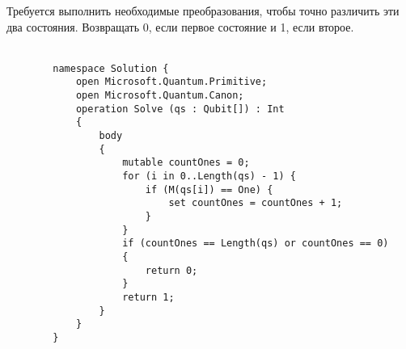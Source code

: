 \documentclass{article}
\begin{document}
\begin{enumerate}
        Требуется выполнить необходимые преобразования, чтобы точно различить эти два состояния. Возвращать $0$, если первое состояние и 1, если второе. \\\\
        \begin{lstlisting}
        namespace Solution {
            open Microsoft.Quantum.Primitive;
            open Microsoft.Quantum.Canon;
            operation Solve (qs : Qubit[]) : Int
            {
                body
                {
                    mutable countOnes = 0;
                    for (i in 0..Length(qs) - 1) {
                        if (M(qs[i]) == One) {
                            set countOnes = countOnes + 1;
                        }
                    }
                    if (countOnes == Length(qs) or countOnes == 0)
                    {
                        return 0;
                    }
                    return 1;
                }
            }
        }
        \end{lstlisting}

    \end{enumerate}
    
\end{document}
